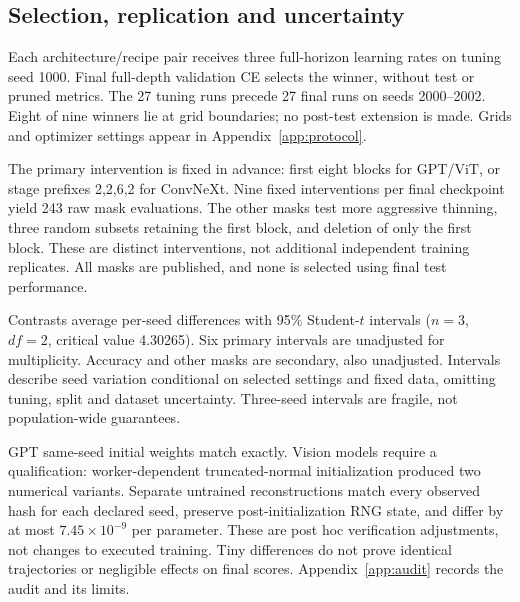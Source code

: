 \documentclass[10pt,letterpaper]{article}
\begin{document}
\clearpage
\subsection{Selection, replication and uncertainty}
Each architecture/recipe pair receives three full-horizon learning rates on tuning seed 1000. Final full-depth validation CE selects the winner, without test or pruned metrics. The 27 tuning runs precede 27 final runs on seeds 2000--2002. Eight of nine winners lie at grid boundaries; no post-test extension is made. Grids and optimizer settings appear in Appendix~\ref{app:protocol}.

The primary intervention is fixed in advance: first eight blocks for GPT/ViT, or stage prefixes 2,2,6,2 for ConvNeXt. Nine fixed interventions per final checkpoint yield 243 raw mask evaluations. The other masks test more aggressive thinning, three random subsets retaining the first block, and deletion of only the first block. These are distinct interventions, not additional independent training replicates. All masks are published, and none is selected using final test performance.

Contrasts average per-seed differences with 95\% Student-$t$ intervals ($n=3$, $df=2$, critical value 4.30265). Six primary intervals are unadjusted for multiplicity. Accuracy and other masks are secondary, also unadjusted. Intervals describe seed variation conditional on selected settings and fixed data, omitting tuning, split and dataset uncertainty. Three-seed intervals are fragile, not population-wide guarantees.

GPT same-seed initial weights match exactly. Vision models require a qualification: worker-dependent truncated-normal initialization produced two numerical variants. Separate untrained reconstructions match every observed hash for each declared seed, preserve post-initialization RNG state, and differ by at most $7.45\times10^{-9}$ per parameter. These are post hoc verification adjustments, not changes to executed training. Tiny differences do not prove identical trajectories or negligible effects on final scores. Appendix~\ref{app:audit} records the audit and its limits.
\end{document}
